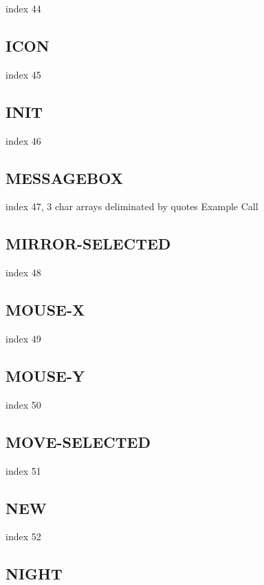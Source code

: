 \documentclass[a4paper]{report}
\begin{document}
{{{{{{{{{{{{{index 44

\subsection{ICON}

index 45

\subsection{INIT}

index 46

\subsection{MESSAGEBOX}

index 47, 3 char arrays deliminated by quotes Example Call

\subsection{MIRROR-SELECTED}

index 48

\subsection{MOUSE-X}

index 49

\subsection{MOUSE-Y}

index 50

\subsection{MOVE-SELECTED}

index 51

\subsection{NEW}

index 52

\subsection{NIGHT}

}}}}}}}}}}}}}
\end{document}
